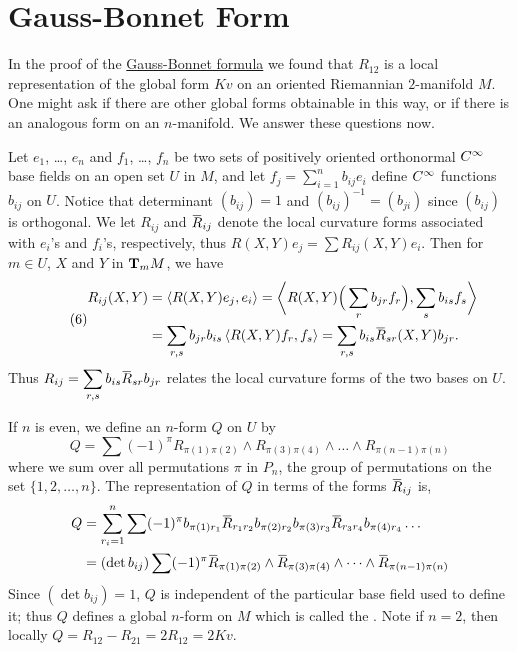 \documentclass[../main]{subfiles}
\begin{document}
\section{Gauss-Bonnet Form}\label{ch08:s3}

In the proof of the \hyperref[thm:ch8.1.1]{Gauss-Bonnet formula} we found that $R_{12}$ is a local representation of the global form $Kv$ on an oriented Riemannian $2$-manifold $M$. One might ask if there are other global forms obtainable in this way, or if there is an analogous form on an $n$-manifold. We answer these questions now.

Let $e_1$, \dots, $e_n$ and $f_1$, \dots, $f_n$ be two sets of positively oriented orthonormal $\CInfty$ base fields on an open set $U$ in $M$, and let $f_j = \sum_{i=1}^n b_{ij} e_i$ define $\CInfty$ functions $b_{ij}$ on $U$. Notice that determinant $(b_{ij}) = 1$ and $(b_{ij})^{-1} = (b_{ji})$ since $(b_{ij})$ is orthogonal. We let $R_{ij}$ and $\xoverline{R}_{ij}$ denote the local curvature forms associated with $e_i$'s and $f_i$'s, respectively, thus $R(X, Y) e_j = \sum R_{ij}(X, Y) e_i$. Then for $m \in U$, $X$ and $Y$ in $\tangentspace{M}{m}$, we have
\begin{equation} \tag{6}\label{eq:ch8.3.1} \begin{split}
    R_{ij}(X, Y) &= \ip{R(X, Y) e_j}{e_i} = \bigg\langle R(X, Y)\Big(\sum_r b_{jr} f_r\Big),\sum_s b_{is} f_s\bigg\rangle \\
    &= \sum_{r,s} b_{jr} b_{is} \ip{R(X, Y) f_r}{f_s} = \sum_{r,s} b_{is} \xoverline{R}_{sr}(X, Y) b_{jr}\text{.}
\end{split} \end{equation}%
Thus $R_{ij} = \displaystyle \sum_{r,s} b_{is} \xoverline{R}_{sr} b_{jr}$ relates the local curvature forms of the two bases on $U$.

If $n$ is even, we define an $n$-form $Q$ on $U$ by
\begin{equation}\tag{7} \label{eq:ch8.3.2}
    Q = \sum (-1)^\pi R_{\pi(1)\pi(2)} \wedge R_{\pi(3)\pi(4)} \wedge \dots \wedge R_{\pi(n-1)\pi(n)}
\end{equation}%
where we sum over all permutations $\pi$ in $P_{n}$, the group of permutations on the set $\{1,2, \ldots, n\}$. The representation of $Q$ in terms of the forms $\xoverline{R}_{i j}$ is,
\begin{align*}
    Q &= \sum_{r_i = 1}^{n} \sum (-1)^\pi b_{\pi(1) r_1} \xoverline{R}_{r_1 r_2} b_{\pi(2) r_2} b_{\pi(3) r_3} \xoverline{R}_{r_3 r_4} b_{\pi(4) r_4} \dots \\
    &= (\det b_{ij}) \sum (-1)^\pi \xoverline{R}_{\pi(1) \pi(2)} \wedge \xoverline{R}_{\pi(3) \pi(4)} \wedge \dots \wedge \xoverline{R}_{\pi(n-1) \pi(n)}
\end{align*}%
Since $(\det b_{ij}) = 1$, $Q$ is independent of the particular base field used to define it; thus $Q$ defines a global $n$-form on $M$ which is called the . Note if $n=2$, then locally $Q = R_{12} - R_{21} = 2R_{12} = 2Kv$.
\end{document}
